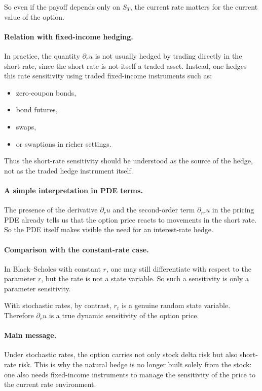 \documentclass[11pt]{article}
\theoremstyle{plain}
\theoremstyle{definition}
\theoremstyle{remark}
\begin{document}
So even if the payoff depends only on \(S_T\), the current rate matters
for the current value of the option.

\paragraph{Relation with fixed-income hedging.}
In practice, the quantity \(\partial_r u\) is not usually hedged by
trading directly in the short rate, since the short rate is not itself a
traded asset.
Instead, one hedges this rate sensitivity using traded fixed-income
instruments such as:
\begin{itemize}[leftmargin=1.4em]
    \item zero-coupon bonds,
    \item bond futures,
    \item swaps,
    \item or swaptions in richer settings.
\end{itemize}

Thus the short-rate sensitivity should be understood as the source of
the hedge, not as the traded hedge instrument itself.

\paragraph{A simple interpretation in PDE terms.}
The presence of the derivative \(\partial_r u\) and the second-order
term \(\partial_{rr}u\) in the pricing PDE already tells us that the
option price reacts to movements in the short rate.
So the PDE itself makes visible the need for an interest-rate hedge.

\paragraph{Comparison with the constant-rate case.}
In Black--Scholes with constant \(r\), one may still differentiate with
respect to the parameter \(r\), but the rate is not a state variable.
So such a sensitivity is only a parameter sensitivity.

With stochastic rates, by contrast, \(r_t\) is a genuine random state
variable.
Therefore \(\partial_r u\) is a true dynamic sensitivity of the option
price.

\paragraph{Main message.}
Under stochastic rates, the option carries not only stock delta risk but
also short-rate risk.
This is why the natural hedge is no longer built solely from the stock:
one also needs fixed-income instruments to manage the sensitivity of the
price to the current rate environment.
\end{document}

